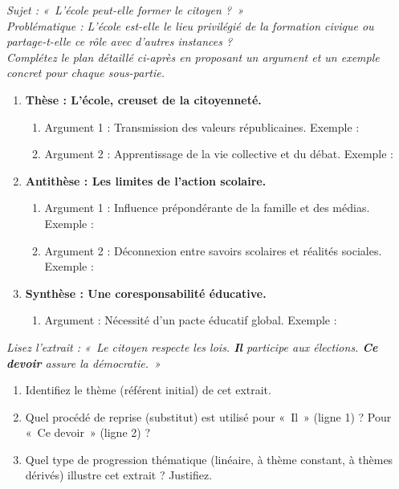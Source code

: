\documentclass[11pt]{article}
\begin{document}
\begin{exercice}
\emph{Sujet : «~L'école peut-elle former le citoyen ?~»\\}
\emph{Problématique : L'école est-elle le lieu privilégié de la formation civique ou partage-t-elle ce rôle avec d'autres instances ?\\}
\emph{Complétez le plan détaillé ci-après en proposant un argument et un exemple concret pour chaque sous-partie.}
\begin{enumerate}
    \item \textbf{Thèse : L'école, creuset de la citoyenneté.}
    \begin{enumerate}
        \item Argument 1 : Transmission des valeurs républicaines. Exemple : \dotfill
        \item Argument 2 : Apprentissage de la vie collective et du débat. Exemple : \dotfill
    \end{enumerate}
    \item \textbf{Antithèse : Les limites de l'action scolaire.}
    \begin{enumerate}
        \item Argument 1 : Influence prépondérante de la famille et des médias. Exemple : \dotfill
        \item Argument 2 : Déconnexion entre savoirs scolaires et réalités sociales. Exemple : \dotfill
    \end{enumerate}
    \item \textbf{Synthèse : Une coresponsabilité éducative.}
    \begin{enumerate}
        \item Argument : Nécessité d'un pacte éducatif global. Exemple : \dotfill
    \end{enumerate}
\end{enumerate}
\end{exercice}

\begin{exercice}
\emph{Lisez l'extrait : «~Le citoyen respecte les lois. \textbf{Il} participe aux élections. \textbf{Ce devoir} assure la démocratie.~»}
\begin{enumerate}
    \item Identifiez le thème (référent initial) de cet extrait.
    \item Quel procédé de reprise (substitut) est utilisé pour «~Il~» (ligne 1) ? Pour «~Ce devoir~» (ligne 2) ?
    \item Quel type de progression thématique (linéaire, à thème constant, à thèmes dérivés) illustre cet extrait ? Justifiez.
\end{enumerate}
\end{exercice}
\end{document}
